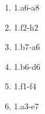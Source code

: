 \begin{enumerate}
\item 1.\rook{}a6-a8\mate{}
\item 1.\rook{}f2-h2\mate{}
\item 1.\queen{}b7-a6\mate{}
\item 1.\rook{}b6-d6\mate{}
\item 1.\rook{}f1-f4\mate{}
\item 1.\queen{}a3-e7\mate{}
\setcounter{d_counter}{\value{enumi}}
\end{enumerate}